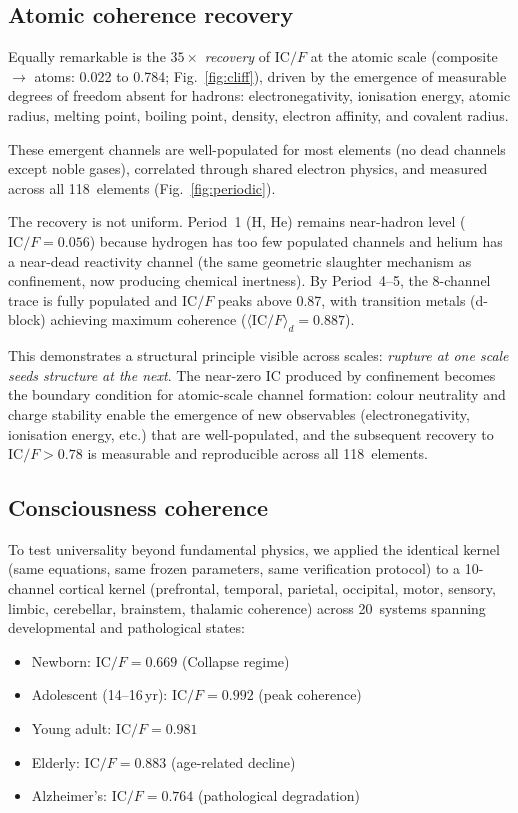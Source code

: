 \documentclass[
  aps,
  prx,
  twocolumn,
  superscriptaddress,
  nofootinbib,
  floatfix
]{revtex4-2}
\newcommand{\IC}{\mathrm{IC}}
\begin{document}
\subsection{Atomic coherence recovery}

Equally remarkable is the $35\times$ \emph{recovery} of $\IC/F$ at
the atomic scale (composite $\to$ atoms: 0.022 to 0.784;
Fig.~\ref{fig:cliff}), driven by the emergence of measurable
degrees of freedom absent for hadrons: electronegativity,
ionisation energy, atomic radius, melting point, boiling point,
density, electron affinity, and covalent radius.

These emergent channels are well-populated for most elements (no dead
channels except noble gases), correlated through shared electron
physics, and measured across all 118~elements
(Fig.~\ref{fig:periodic}).

The recovery is not uniform. Period~1 (H, He) remains
near-hadron level ($\IC/F = 0.056$) because hydrogen has too few
populated channels and helium has a near-dead reactivity channel
(the same geometric slaughter mechanism as confinement, now
producing chemical inertness). By Period~4--5, the 8-channel trace
is fully populated and $\IC/F$ peaks above 0.87, with transition
metals (d-block) achieving maximum coherence ($\langle\IC/F\rangle_d
= 0.887$).

This demonstrates a structural principle visible across scales:
\emph{rupture at one scale seeds structure at the next}.
The near-zero $\IC$ produced by confinement becomes the boundary
condition for atomic-scale channel formation: colour neutrality
and charge stability enable the emergence of new observables
(electronegativity, ionisation energy, etc.) that are well-populated,
and the subsequent recovery to $\IC/F > 0.78$ is measurable and
reproducible across all 118~elements.

\subsection{Consciousness coherence}

To test universality beyond fundamental physics, we applied the
identical kernel (same equations, same frozen parameters, same
verification protocol) to a 10-channel cortical kernel
(prefrontal, temporal, parietal, occipital, motor, sensory, limbic,
cerebellar, brainstem, thalamic coherence) across 20~systems spanning
developmental and pathological states:

\begin{itemize}[leftmargin=1.5em,itemsep=1pt]
\item Newborn: $\IC/F = 0.669$ (Collapse regime)
\item Adolescent (14--16\,yr): $\IC/F = 0.992$ (peak coherence)
\item Young adult: $\IC/F = 0.981$
\item Elderly: $\IC/F = 0.883$ (age-related decline)
\item Alzheimer's: $\IC/F = 0.764$ (pathological degradation)
\end{itemize}
\end{document}
